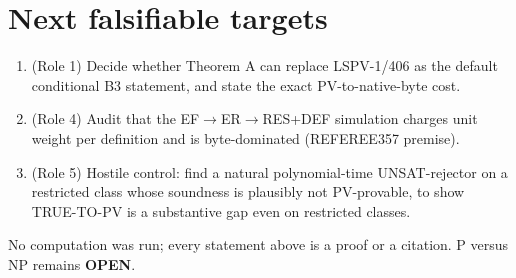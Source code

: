 \documentclass[11pt]{article}
\begin{document}
\section{Next falsifiable targets}
\begin{enumerate}
\item (Role 1) Decide whether Theorem A can replace LSPV-1/406 as the default
conditional B3 statement, and state the exact PV-to-native-byte cost.
\item (Role 4) Audit that the EF$\to$ER$\to$RES+DEF simulation charges unit
weight per definition and is byte-dominated (REFEREE357 premise).
\item (Role 5) Hostile control: find a natural polynomial-time UNSAT-rejector
on a restricted class whose soundness is plausibly not PV-provable, to show
\textsf{TRUE-TO-PV} is a substantive gap even on restricted classes.
\end{enumerate}
No computation was run; every statement above is a proof or a citation.
P versus NP remains \textbf{OPEN}.

\end{document}
